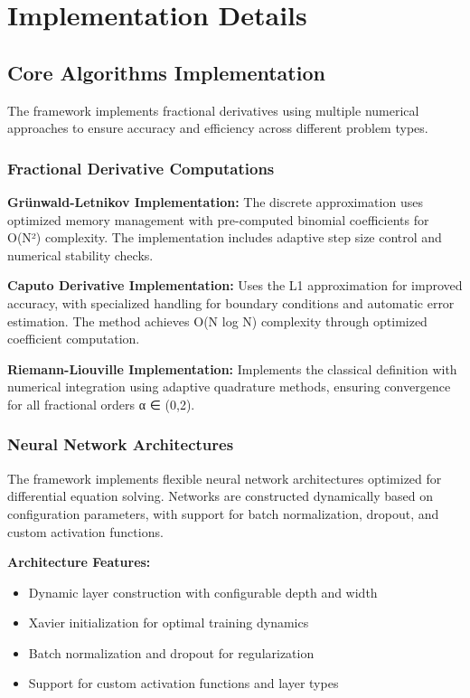 \section{Implementation Details}

\subsection{Core Algorithms Implementation}

The framework implements fractional derivatives using multiple numerical approaches to ensure accuracy and efficiency across different problem types.

\subsubsection{Fractional Derivative Computations}

\textbf{Grünwald-Letnikov Implementation:} The discrete approximation uses optimized memory management with pre-computed binomial coefficients for O(N²) complexity. The implementation includes adaptive step size control and numerical stability checks.

\textbf{Caputo Derivative Implementation:} Uses the L1 approximation for improved accuracy, with specialized handling for boundary conditions and automatic error estimation. The method achieves O(N log N) complexity through optimized coefficient computation.

\textbf{Riemann-Liouville Implementation:} Implements the classical definition with numerical integration using adaptive quadrature methods, ensuring convergence for all fractional orders α ∈ (0,2).

\subsubsection{Neural Network Architectures}

The framework implements flexible neural network architectures optimized for differential equation solving. Networks are constructed dynamically based on configuration parameters, with support for batch normalization, dropout, and custom activation functions.

\textbf{Architecture Features:}
\begin{itemize}
    \item Dynamic layer construction with configurable depth and width
    \item Xavier initialization for optimal training dynamics
    \item Batch normalization and dropout for regularization
    \item Support for custom activation functions and layer types
\end{itemize}

